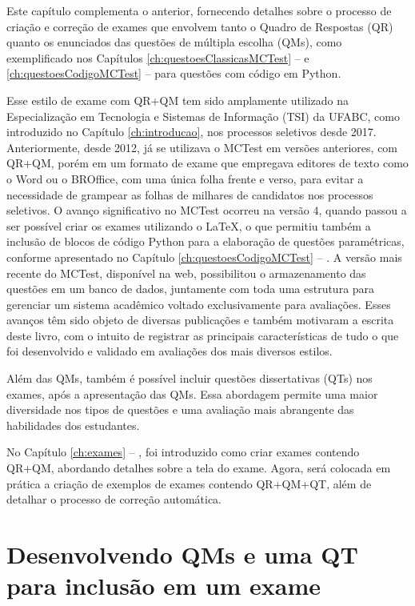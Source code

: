 \label{ch:examesQM_QT}

Este capítulo complementa o anterior, fornecendo detalhes sobre o processo de criação e correção de exames que envolvem tanto o Quadro de Respostas (QR) quanto os enunciados das questões de múltipla escolha (QMs), como exemplificado nos Capítulos \ref{ch:questoesClassicasMCTest} --  e  \ref{ch:questoesCodigoMCTest} --  para questões com código em Python.

Esse estilo de exame com QR+QM tem sido amplamente utilizado na Especialização em Tecnologia e Sistemas de Informação (TSI) da UFABC, como introduzido no Capítulo \ref{ch:introducao}, nos processos seletivos desde 2017. Anteriormente, desde 2012, já se utilizava o MCTest em versões anteriores, com QR+QM, porém em um formato de exame que empregava editores de texto como o Word ou o BROffice, com uma única folha frente e verso, para evitar a necessidade de grampear as folhas de milhares de candidatos nos processos seletivos. O avanço significativo no MCTest ocorreu na versão 4, quando passou a ser possível criar os exames utilizando o \LaTeX{}, o que permitiu também a inclusão de blocos de código Python para a elaboração de questões paramétricas, conforme apresentado no Capítulo \ref{ch:questoesCodigoMCTest} -- . A versão mais recente do MCTest, disponível na web, possibilitou o armazenamento das questões em um banco de dados, juntamente com toda uma estrutura para gerenciar um sistema acadêmico voltado exclusivamente para avaliações. Esses avanços têm sido objeto de diversas publicações e também motivaram a escrita deste livro, com o intuito de registrar as principais características de tudo o que foi desenvolvido e validado em avaliações dos mais diversos estilos.

Além das QMs, também é possível incluir questões dissertativas (QTs) nos exames, após a apresentação das QMs. Essa abordagem permite uma maior diversidade nos tipos de questões e uma avaliação mais abrangente das habilidades dos estudantes.

No Capítulo \ref{ch:exames} -- , foi introduzido como criar exames contendo QR+QM, abordando detalhes sobre a tela do exame. Agora, será colocada em prática a criação de exemplos de exames contendo QR+QM+QT, além de detalhar o processo de correção automática.

\section{Desenvolvendo QMs e uma QT para inclusão em um exame}\label{sec:questoesQM_QT}

